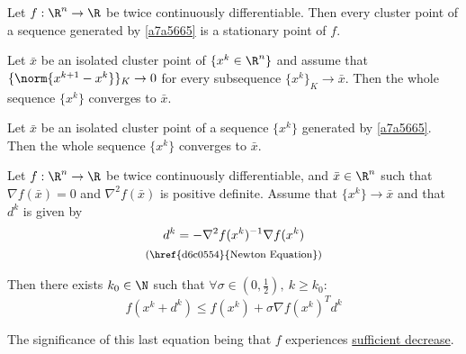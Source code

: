 \label{a66db73}

Let $f:\R^n\to\R$ be twice continuously differentiable. Then every cluster
point of a sequence generated by \autoref{a7a5665} is a stationary point of
$f$.

%
%

\label{a95dfe1}

Let $\bar x$ be an isolated cluster point of $\{x^k\in\R^n\}$ and assume that
$\{\norm{x^{k+1}-x^k}\}_K\to0$ for every subsequence $\{x^k\}_K\to\bar x$. Then
the whole sequence $\{x^k\}$ converges to $\bar x$.

\Corollary{}\label{aabc89a}

Let $\bar x$ be an isolated cluster point of a sequence $\{x^k\}$ generated by
\autoref{a7a5665}. Then the whole sequence $\{x^k\}$ converges to $\bar x$.

\label{d6d6148}

Let $f:\R^n\to\R$ be twice continuously differentiable, and $\bar x\in\R^n$
such that $\nabla f(\bar x)=0$ and $\nabla^2f(\bar x)$ is positive definite.
Assume that $\{x^k\}\to\bar x$ and that $d^k$ is given by
\begin{gather*}
  d^k = -\nabla^2f(x^k)^{-1}\nabla f(x^k) \\
  \text{\footnotesize{(\href{d6c0554}{Newton Equation})}}
\end{gather*}

Then there exists $k_0\in\N$ such that $\forall\sigma\in(0,\frac12),\ k\geq
k_0$:
$$
  f(x^k+d^k)\leq f(x^k)+\sigma\nabla f(x^k)^Td^k
$$

The significance of this last equation being that $f$ experiences
\href{fefb024}{sufficient decrease}.

\Theorem{}\label{e58830c}

